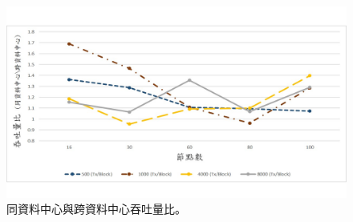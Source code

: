 \begin{figure}[htp]
\centering
\includegraphics[scale=0.5]{images/65.jpg}
\caption{同資料中心與跨資料中心吞吐量比。}
\label{i:byz-latency}
\end{figure}
